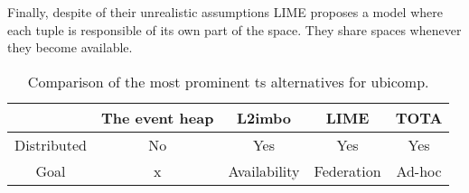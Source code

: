 Finally, despite of their unrealistic assumptions LIME proposes a model where each tuple is responsible of its own part of the space.
They share spaces whenever they become available.


\begin{table}%
  \centering
  \begin{tabular}{c|cccc}%
      ~ & The event heap & L2imbo & LIME & TOTA \\
      \hline
      \hline
      Distributed & No & Yes & Yes & Yes \\
      Goal & x & Availability & Federation & Ad-hoc \\
  \end{tabular}
  \caption{Comparison of the most prominent \acl{ts} alternatives for \acl{ubicomp}.} %
  \label{tab:myfirsttable}
\end{table}